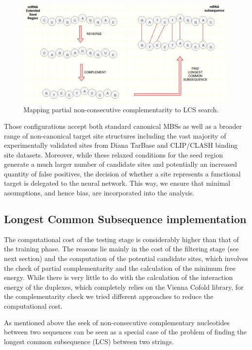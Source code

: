 \begin{figure}[hbt!]
	\centering
	\includegraphics[width=1\textwidth]{Figures/lcs}
	\caption{ Mapping partial non-consecutive complementarity to LCS search.}
	\label{fig:lcs}
\end{figure}

Those configurations accept both standard canonical MBSs as well as a broader
range of non-canonical target site structures including the vast majority of experimentally validated sites from Diana TarBase and CLIP/CLASH binding site
datasets. Moreover, while these relaxed conditions for the seed region generate a much larger number of candidate sites and potentially an increased quantity of false positives, the decision of whether a site represents a functional target is delegated to the neural network. This way, we ensure that minimal assumptions, and hence bias, are incorporated into the analysis. 

\subsection{Longest Common Subsequence implementation}
The computational cost of the testing stage is considerably higher than that of the training phase. The reasons lie mainly in the cost of the filtering stage (see next section) and the computation of the potential candidate sites, which involves the check of partial complementarity and the calculation of the minimum free energy.    
While there is very little to do with the calculation of the interaction energy of the duplexes, which completely relies on the Vienna Cofold library, for the complementarity check we tried different approaches to reduce the computational cost.

As mentioned above the seek of non-consecutive complementary nucleotides between two sequences can be seen as a special case of the problem of finding the longest common subsequence (LCS) between two strings. 

